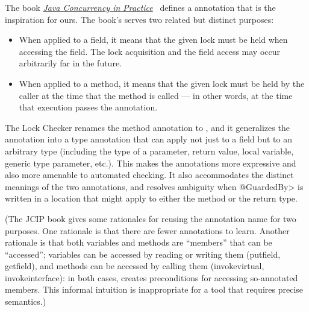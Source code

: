The book \href{http://jcip.net/}{\emph{Java Concurrency in Practice}}~\cite{Goetz2006} defines a
\href{http://jcip.net.s3-website-us-east-1.amazonaws.com/annotations/doc/net/jcip/annotations/GuardedBy.html}{} annotation that is the inspiration for ours.  The book's
 serves two related but distinct purposes:

\begin{itemize}
\item
  When applied to a field, it means that the given lock must be held when
  accessing the field.  The lock acquisition and the field access may occur
  arbitrarily far in the future.
\item
  When applied to a method, it means that the given lock must be held by
  the caller at the time that the method is called --- in other words, at
  the time that execution passes the  annotation.
\end{itemize}

The Lock Checker renames the method annotation to
, and it generalizes the
 annotation into a type annotation
that can apply not just to a field but to an arbitrary type (including the
type of a parameter, return value, local variable, generic type parameter,
etc.).  This makes the annotations more expressive and also more amenable
to automated checking.  It also accommodates the distinct
meanings of the two annotations, and resolves ambiguity when \<@GuardedBy>
is written in a location that might apply to either the method or the
return type.

(The JCIP book gives some rationales for reusing the annotation name for
two purposes.  One rationale is
that there are fewer annotations to learn.  Another rationale is
that both variables and methods are ``members'' that can be ``accessed'';
variables can be accessed by reading or writing them (putfield, getfield),
and methods can be accessed by calling them (invokevirtual,
invokeinterface):  in both cases,  creates preconditions
for accessing so-annotated members.  This informal intuition is
inappropriate for a tool that requires precise semantics.)



